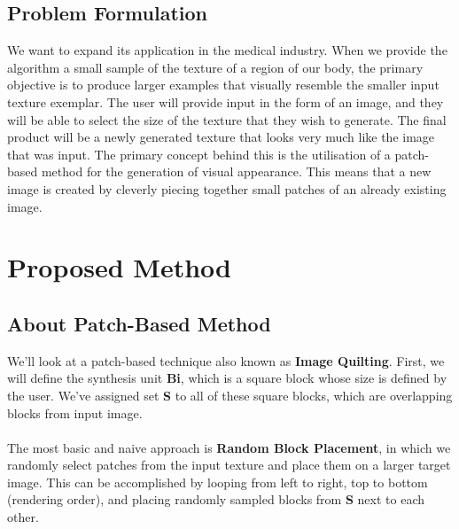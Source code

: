 \documentclass[12pt,a4paper]{report}
\begin{document}
\section{Problem Formulation}
We want to expand its application in the medical industry. When we provide the algorithm a small sample of the texture of a region of our body, the primary objective is to produce larger examples that visually resemble the smaller input texture exemplar. The user will provide input in the form of an image, and they will be able to select the size of the texture that they wish to generate. The final product will be a newly generated texture that looks very much like the image that was input. The primary concept behind this is the utilisation of a patch-based method for the generation of visual appearance. This means that a new image is created by cleverly piecing together small patches of an already existing image.



\chapter{Proposed Method}

\section{About Patch-Based Method}
We'll look at a patch-based technique also known as \textbf{Image Quilting}. First, we will define the synthesis unit \textbf{Bi}, which is a square block whose size is defined by the user. We've assigned set \textbf{S} to all of these square blocks, which are overlapping blocks from input image.
\\\\
The most basic and naive approach is \textbf{Random Block Placement}, in which we randomly select patches from the input texture and place them on a larger target image. This can be accomplished by looping from left to right, top to bottom (rendering order), and placing randomly sampled blocks from \textbf{S} next to each other.
\end{document}
